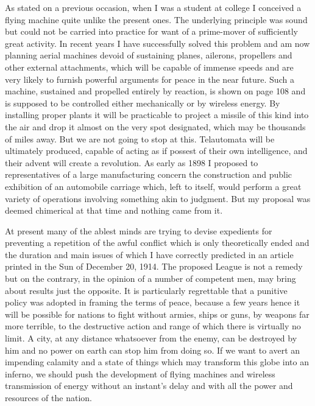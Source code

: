 \documentclass[a4paper,12pt,english,twoside,openright]{memoir}
\begin{document}
As stated on a previous occasion, when I was a student at college I conceived a flying machine 
quite unlike the present ones.  The underlying principle was sound but could not be carried into 
practice for want of a prime-mover of sufficiently great activity.  In recent years I have 
successfully solved this problem and am now planning aerial machines devoid of sustaining 
planes, ailerons, propellers and other external attachments, which will be capable of immense 
speeds and are very likely to furnish powerful arguments for peace in the near future.  Such a 
machine, sustained and propelled entirely by reaction, is shown on page 108 and is supposed to 
be controlled either mechanically or by wireless energy.  By installing proper plants it will be 
practicable to project a missile of this kind into the air and drop it almost on the very spot 
designated, which may be thousands of miles away.  But we are not going to stop at this.  
Telautomata will be ultimately produced, capable of acting as if possest of their own intelligence, 
and their advent will create a revolution.  As early as 1898 I proposed to representatives of a 
large manufacturing concern the construction and public exhibition of an automobile carriage 
which, left to itself, would perform a great variety of operations involving something akin to 
judgment.  But my proposal was deemed chimerical at that time and nothing came from it.  

At present many of the ablest minds are trying to devise expedients for preventing a repetition of 
the awful conflict which is only theoretically ended and the duration and main issues of which I 
have correctly predicted in an article printed in the Sun of December 20, 1914.  The proposed 
League is not a remedy but on the contrary, in the opinion of a number of competent men, may 
bring about results just the opposite.  It is particularly regrettable that a punitive policy was 
adopted in framing the terms of peace, because a few years hence it will be possible for nations 
to fight without armies, ships or guns, by weapons far more terrible, to the destructive action and 
range of which there is virtually no limit.  A city, at any distance whatsoever from the enemy, can 
be destroyed by him and no power on earth can stop him from doing so.  If we want to avert an 
impending calamity and a state of things which may transform this globe into an inferno, we 
should push the development of flying machines and wireless transmission of energy without an 
instant's delay and with all the power and resources of the nation.
\end{document}
